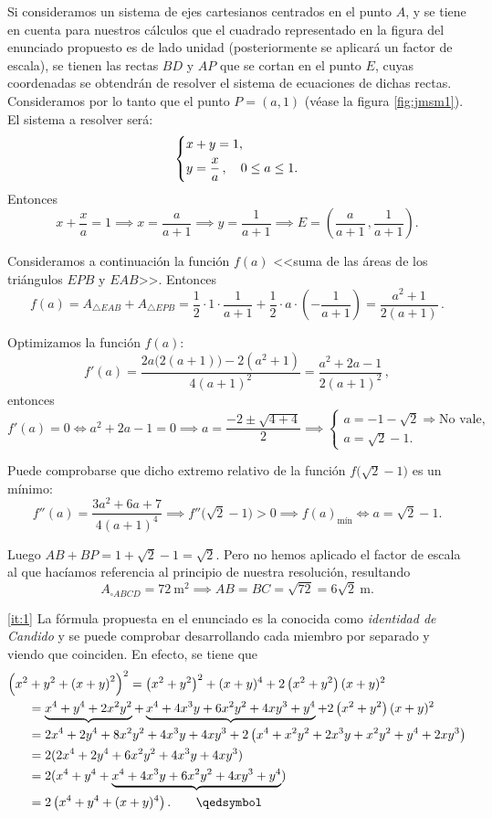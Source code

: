 \documentclass[
	fecha={5 de agosto de 2025},
	palabrasclave={RetoSecundaria, ago2025, álgebra, dif1},
	codigo=minted
]{RetoMatematico}
\begin{document}
Si consideramos un sistema de ejes cartesianos centrados en el punto \(A\), y se tiene en cuenta para nuestros cálculos que el cuadrado representado en la figura del enunciado propuesto es de lado unidad (posteriormente se aplicará un factor de escala), se tienen las rectas \(BD\) y \(AP\) que se cortan en el punto \(E\), cuyas coordenadas se obtendrán de resolver el sistema de ecuaciones de dichas rectas. Consideramos por lo tanto que el punto \(P=(a,1)\) (véase la figura \ref{fig:jmsm1}). El sistema a resolver será:
\[
\begin{dcases}
	x+y=1,\\ y=\frac{x}{a}\,,\quad 0\leq a\leq 1.
\end{dcases}
\]
Entonces
\[
x+\frac{x}{a}=1\implies x=\frac{a}{a+1}\implies y=\frac{1}{a+1}\implies E=\left(\frac{a}{a+1}\,,\frac{1}{a+1}\right).
\]

Consideramos a continuación la función \(f(a)\) <<suma de las áreas de los triángulos \(EPB\) y \(EAB\)>>. Entonces
\[
f(a)=A_{\triangle EAB}+A_{\triangle EPB}=\frac{1}{2}\cdot 1\cdot \frac{1}{a+1}+\frac{1}{2}\cdot a\cdot\left(-\frac{1}{a+1}\right)=\frac{a^2+1}{2(a+1)}\,.
\]

Optimizamos la función \(f(a)\):
\[
f'(a)=\frac{2a\big(2(a+1)\big)-2(a^2+1)}{4(a+1)^2}=\frac{a^2+2a-1}{2(a+1)^2}\,,
\]
entonces
\[
f'(a)=0\iff a^2+2a-1=0\implies a=\frac{-2\pm\sqrt{4+4}}{2}\implies\begin{cases}a=-1-\sqrt{2}\Rightarrow\text{No vale},\\a=\sqrt{2}-1.\end{cases}
\]

Puede comprobarse que dicho extremo relativo de la función \(f\big(\sqrt{2}-1\big)\) es un mínimo:
\[
f''(a)=\frac{3a^2+6a+7}{4(a+1)^4}\implies f''\big(\sqrt{2}-1\big)>0\implies f(a)_{\text{mín}}\iff a=\sqrt{2}-1.
\]

Luego \(AB+BP=1+\sqrt{2}-1=\sqrt{2}\). Pero no hemos aplicado el factor de escala al que hacíamos referencia al principio de nuestra resolución, resultando
\[
A_{\square ABCD}=72\ \text{m}^2\implies AB=BC=\sqrt{72}=6\sqrt{2}\ \text{m}.
\]



\ref{it:1} La fórmula propuesta en el enunciado es la conocida como \emph{identidad de Candido} y se puede comprobar desarrollando cada miembro por separado y viendo que coinciden. En efecto, se tiene que
\begin{align*}
	\Bigl(x^2&+y^2+\l(x+y\r)^2\Bigr)^2 = \l(x^2 + y^2\r)^2 + (x+y)^4 + 2\l(x^2 + y^2\r)(x+y)^2\\
	&= \underbrace{x^4 + y^4 + 2x^2y^2}+\underbrace{x^4 + 4x^3y + 6x^2y^2 + 4xy^3 + y^4} + 2\l(x^2 + y^2\r)(x+y)^2\\
	&= 2x^4 + 2y^4 + 8x^2y^2 + 4x^3y + 4xy^3 + 2\l(x^4 + x^2y^2 + 2x^3 y + x^2 y^2 + y^4 + 2xy^3\r)\\
	&= 2(2x^4 + 2y^4 + 6x^2y^2 + 4x^3 y + 4xy^3)\\
	&= 2(x^4 + y^4 + \underbrace{x^4 + 4x^3 y + 6x^2y^2 + 4xy^3 + y^4})\\
	&= 2\l(x^4 + y^4 + (x+y)^4\r). \tag*{\qedsymbol}
\end{align*}
\end{document}
